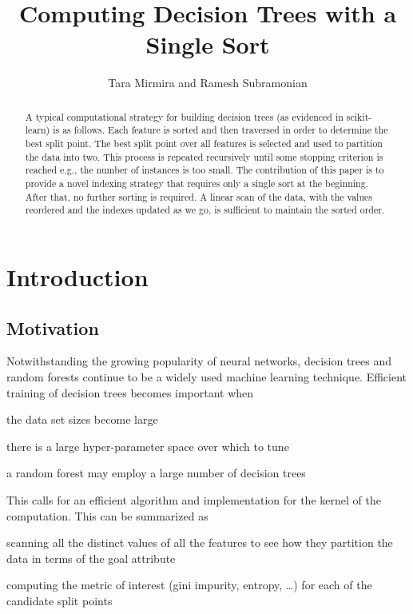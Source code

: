 \documentclass[12pt,letterpaper]{article}
\begin{document}
\title{Computing Decision Trees with a Single Sort}
\author{Tara Mirmira and Ramesh Subramonian}
\maketitle
\thispagestyle{fancy}
\lhead{}
\chead{}
\rhead{}
\lfoot{}
\rfoot{{\small \thepage}}

\begin{abstract}
A typical computational strategy for building decision trees (as evidenced in
  scikit-learn) is as follows. Each feature is sorted and then traversed in
  order to determine the best split point. The best split point over
  all features is selected and used to partition the data into two. This
  process is repeated recursively until some stopping criterion is reached e.g.,
  the number of instances is
  too small. The contribution of this paper is to provide a novel indexing
  strategy that requires only a single sort at the beginning. After that, no
  further sorting is required. A linear scan of the data, with the values
  reordered and the indexes updated as we go, is sufficient to maintain the sorted order.
\end{abstract}

\section{Introduction}

\TBC

\subsection{Motivation}
Notwithstanding the growing popularity of neural networks, decision trees and
random forests continue to be a widely used machine learning technique.
Efficient training of decision trees becomes important when 
\be
\item the data set sizes become large
\item there is a large hyper-parameter space over which to tune
\item a random forest may employ a large number of decision  trees
\ee

This calls for an efficient algorithm and implementation for the kernel of the
computation. This can be summarized as 
\be
\item scanning all the distinct values of all the features to see how they
  partition the data in terms of the goal attribute
\item computing the metric of interest (gini impurity, entropy, \ldots) for 
 each of the
  candidate split points
  \ee
\end{document}
